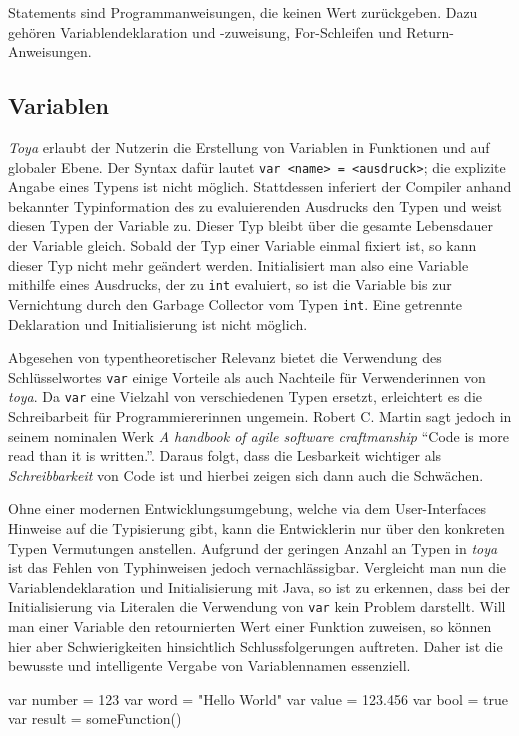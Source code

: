 Statements sind Programmanweisungen, die keinen Wert zurückgeben. Dazu gehören Variablendeklaration und -zuweisung, For-Schleifen und Return-Anweisungen.

\subsection{Variablen}
\textit{Toya} erlaubt der Nutzerin die Erstellung von Variablen in Funktionen und auf globaler Ebene. Der Syntax dafür lautet \texttt{var <name> = <ausdruck>}; die explizite Angabe eines Typens ist nicht möglich. Stattdessen inferiert der Compiler anhand bekannter Typinformation des zu evaluierenden Ausdrucks den Typen und weist diesen Typen der Variable zu. Dieser Typ bleibt über die gesamte Lebensdauer der Variable gleich. Sobald der Typ einer Variable einmal fixiert ist, so kann dieser Typ nicht mehr geändert werden. Initialisiert man also eine Variable mithilfe eines Ausdrucks, der zu \texttt{int} evaluiert, so ist die Variable bis zur Vernichtung durch den Garbage Collector vom Typen \texttt{int}. Eine getrennte Deklaration und Initialisierung ist nicht möglich.

Abgesehen von typentheoretischer Relevanz bietet die Verwendung des Schlüsselwortes \texttt{var} einige Vorteile als auch Nachteile für Verwenderinnen von \textit{toya}. Da \texttt{var} eine Vielzahl von verschiedenen Typen ersetzt, erleichtert es die Schreibarbeit für Programmiererinnen ungemein. Robert C. Martin sagt jedoch in seinem nominalen Werk \textit{A handbook of agile software craftmanship} ``Code is more read than it is written.''. Daraus folgt, dass die Lesbarkeit wichtiger als \textit{Schreibbarkeit} von Code ist und hierbei zeigen sich dann auch die Schwächen.

Ohne einer modernen Entwicklungsumgebung, welche via dem User-Interfaces Hinweise auf die Typisierung gibt, kann die Entwicklerin nur über den konkreten Typen Vermutungen anstellen. Aufgrund der geringen Anzahl an Typen in \textit{toya} ist das Fehlen von Typhinweisen jedoch vernachlässigbar. Vergleicht man nun die Variablendeklaration und Initialisierung mit Java, so ist zu erkennen, dass bei der Initialisierung via Literalen die Verwendung von \texttt{var} kein Problem darstellt. Will man einer Variable den retournierten Wert einer Funktion zuweisen, so können hier aber Schwierigkeiten hinsichtlich Schlussfolgerungen auftreten. Daher ist die bewusste und intelligente Vergabe von Variablennamen essenziell.

\begin{ToyaCode}[numbers=none, caption={Variablendeklaration in toya}]
var number = 123
var word = "Hello World"
var value = 123.456
var bool = true
var result = someFunction()
\end{ToyaCode}

